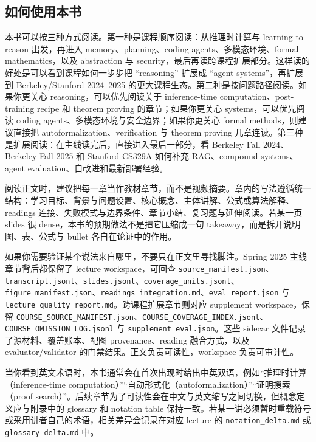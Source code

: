 \subsection*{如何使用本书}

本书可以按三种方式阅读。第一种是课程顺序阅读：从推理时计算与 learning to reason 出发，再进入 memory、planning、coding agents、多模态环境、formal mathematics，以及 abstraction 与 security，最后再读跨课程扩展部分。这样读的好处是可以看到课程如何一步步把 ``reasoning'' 扩展成 ``agent systems''，再扩展到 Berkeley/Stanford 2024--2025 的更大课程生态。第二种是按问题路径阅读。如果你更关心 reasoning，可以优先阅读关于 inference-time computation、post-training recipe 和 theorem proving 的章节；如果你更关心 systems，可以优先阅读 coding agents、多模态环境与安全边界；如果你更关心 formal methods，则建议直接把 autoformalization、verification 与 theorem proving 几章连读。第三种是扩展阅读：在主线读完后，直接进入最后一部分，看 Berkeley Fall 2024、Berkeley Fall 2025 和 Stanford CS329A 如何补充 RAG、compound systems、agent evaluation、自改进和最新部署经验。

阅读正文时，建议把每一章当作教材章节，而不是视频摘要。章内的写法遵循统一结构：学习目标、背景与问题设置、核心概念、主体讲解、公式或算法解释、readings 连接、失败模式与边界条件、章节小结、复习题与延伸阅读。若某一页 slides 很 dense，本书的预期做法不是把它压缩成一句 takeaway，而是拆开说明图、表、公式与 bullet 各自在论证中的作用。

如果你需要验证某个说法来自哪里，不要只在正文里寻找脚注。Spring 2025 主线章节背后都保留了 lecture workspace，可回查 \texttt{source\_manifest.json}、\texttt{transcript.jsonl}、\texttt{slides.jsonl}、\texttt{coverage\_units.jsonl}、\texttt{figure\_manifest.json}、\texttt{readings\_integration.md}、\texttt{eval\_report.json} 与 \texttt{lecture\_quality\_report.md}。跨课程扩展章节则对应 supplement workspace，保留 \texttt{COURSE\_SOURCE\_MANIFEST.json}、\texttt{COURSE\_COVERAGE\_INDEX.jsonl}、\texttt{COURSE\_OMISSION\_LOG.jsonl} 与 \texttt{supplement\_eval.json}。这些 sidecar 文件记录了源材料、覆盖账本、配图 provenance、reading 融合方式，以及 evaluator/validator 的门禁结果。正文负责可读性，workspace 负责可审计性。

当你看到英文术语时，本书通常会在首次出现时给出中英双语，例如“推理时计算（inference-time computation）”“自动形式化（autoformalization）”“证明搜索（proof search）”。后续章节为了可读性会在中文与英文缩写之间切换，但概念定义应与附录中的 glossary 和 notation table 保持一致。若某一讲必须暂时重载符号或采用讲者自己的术语，相关差异会记录在对应 lecture 的 \texttt{notation\_delta.md} 或 \texttt{glossary\_delta.md} 中。

